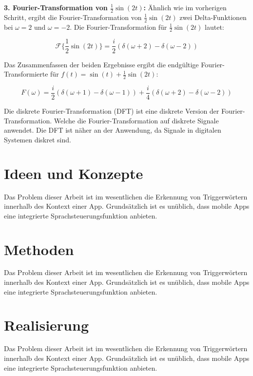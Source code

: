 \documentclass[11pt,a4paper]{article}
\begin{document}
\noindent
\newline
\textbf{3. Fourier-Transformation von \( \frac{1}{2}\sin(2t) \):}  
Ähnlich wie im vorherigen Schritt, ergibt die Fourier-Transformation von \( \frac{1}{2}\sin(2t) \) 
zwei Delta-Funktionen bei \( \omega = 2 \) und \( \omega = -2 \). Die Fourier-Transformation für 
\( \frac{1}{2}\sin(2t) \) lautet:

\begin{equation*}
\mathcal{F}\{\frac{1}{2}\sin(2t)\} = \frac{i}{2} \left( \delta(\omega + 2) - 
\delta(\omega - 2) \right)
\end{equation*}

\noindent
\newline
Das Zusammenfassen der beiden Ergebnisse ergibt die endgültige Fourier-Transformierte für 
\( f(t) = \sin(t) + \frac{1}{2}\sin(2t) \):

\begin{equation*}
F(\omega) = \frac{i}{2} \left( \delta(\omega + 1) - \delta(\omega - 1) \right) + 
\frac{i}{4} \left( \delta(\omega + 2) - \delta(\omega - 2) \right)
\end{equation*}


\noindent
\newline
Die diskrete Fourier-Transformation (DFT) ist eine diskrete Version der Fourier-Transformation.
Welche die Fourier-Transformation auf diskrete Signale anwendet. Die DFT ist näher an der
Anwendung, da Signale in digitalen Systemen diskret sind.








\newpage
\section{Ideen und Konzepte}
Das Problem dieser Arbeit ist im wesentlichen die Erkennung von Triggerwörtern innerhalb
des Kontext einer App. Grundsätzlich ist es unüblich, dass mobile Apps eine
integrierte Sprachsteuerungsfunktion anbieten.


\newpage
\section{Methoden}
Das Problem dieser Arbeit ist im wesentlichen die Erkennung von Triggerwörtern innerhalb
des Kontext einer App. Grundsätzlich ist es unüblich, dass mobile Apps eine
integrierte Sprachsteuerungsfunktion anbieten.


\newpage
\section{Realisierung}
Das Problem dieser Arbeit ist im wesentlichen die Erkennung von Triggerwörtern innerhalb
des Kontext einer App. Grundsätzlich ist es unüblich, dass mobile Apps eine
integrierte Sprachsteuerungsfunktion anbieten.
\end{document}
